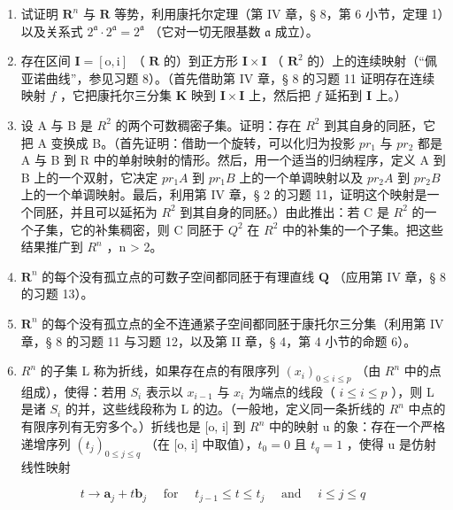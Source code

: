 \ExerciseGroupsStart
\ExerciseSection

\begin{enumerate}
\def\labelenumi{\arabic{enumi})}
\item
  试证明 \(\mathbf{R}^n\) 与 \(\mathbf{R}\) 等势，利用康托尔定理（第 IV 章，§ 8，第 6 小节，定理 1）以及关系式 \(2^{\mathfrak{a}} \cdot 2^{\mathfrak{a}} = 2^{\mathfrak{a}}\) （它对一切无限基数 \(\mathfrak{a}\) 成立）。
\item
  存在区间 \(\mathbf{I} = [\mathrm{o},\mathrm{i}]\) （ \(\mathbf{R}\) 的）到正方形 \(\mathbf{I}\times \mathbf{I}\) （ \(\mathbf{R}^2\) 的）上的连续映射（“佩亚诺曲线”，参见习题 8）。（首先借助第 IV 章，§ 8 的习题 11 证明存在连续映射 \(f\) ，它把康托尔三分集 \(\mathbf{K}\) 映到 \(\mathbf{I}\times \mathbf{I}\) 上，然后把 \(f\) 延拓到 \(\mathbf{I}\) 上。）
\item
  设 A 与 B 是 \(R^{2}\) 的两个可数稠密子集。证明：存在 \(R^{2}\) 到其自身的同胚，它把 A 变换成 B。（首先证明：借助一个旋转，可以化归为投影 \(pr_{1}\) 与 \(pr_{2}\) 都是 A 与 B 到 R 中的单射映射的情形。然后，用一个适当的归纳程序，定义 A 到 B 上的一个双射，它决定 \(pr_{1}A\) 到 \(pr_{1}B\) 上的一个单调映射以及 \(pr_{2}A\) 到 \(pr_{2}B\) 上的一个单调映射。最后，利用第 IV 章，§ 2 的习题 11，证明这个映射是一个同胚，并且可以延拓为 \(R^{2}\) 到其自身的同胚。）由此推出：若 C 是 \(R^{2}\) 的一个子集，它的补集稠密，则 C 同胚于 \(Q^{2}\) 在 \(R^{2}\) 中的补集的一个子集。把这些结果推广到 \(R^{n}\) ，n \textgreater{} 2。
\item
  \(\mathbf{R}^n\) 的每个没有孤立点的可数子空间都同胚于有理直线 \(\mathbf{Q}\) （应用第 IV 章，§ 8 的习题 13）。
\item
  \(\mathbf{R}^n\) 的每个没有孤立点的全不连通紧子空间都同胚于康托尔三分集（利用第 IV 章，§ 8 的习题 11 与习题 12，以及第 II 章，§ 4，第 4 小节的命题 6）。
\item
  \(R^{n}\) 的子集 L 称为折线，如果存在点的有限序列 \((x_{i})_{0\leqslant i\leqslant p}\) （由 \(R^{n}\) 中的点组成），使得：若用 \(S_{i}\) 表示以 \(x_{i-1}\) 与 \(x_{i}\) 为端点的线段（ \(i\leqslant i\leqslant p\) ），则 L 是诸 \(S_{i}\) 的并，这些线段称为 L 的边。（一般地，定义同一条折线的 \(R^{n}\) 中点的有限序列有无穷多个。）折线也是 {[}o, i{]} 到 \(R^{n}\) 中的映射 u 的象：存在一个严格递增序列 \((t_{j})_{0\leqslant j\leqslant q}\) （在 {[}o, i{]} 中取值），\(t_{0}=0\) 且 \(t_{q}=1\) ，使得 u 是仿射线性映射
\end{enumerate}

\[
t \rightarrow \boldsymbol {a} _ {j} + t \boldsymbol {b} _ {j} \quad \text { for } \quad t _ {j - 1} \leqslant t \leqslant t _ {j} \quad \text { and } \quad i \leqslant j \leqslant q
\]

